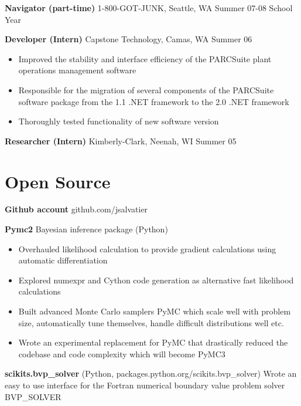 \documentclass[margin]{res}
\begin{document}
\begin{resume}
  {\bf Navigator (part-time)} 1-800-GOT-JUNK, Seattle, WA \hfill  Summer 07-08 School Year

  {\bf Developer (Intern)} Capstone Technology, Camas, WA \hfill  Summer 06
  \begin{itemize} \itemsep -2pt
    \item Improved the stability and interface efficiency of the PARCSuite plant operations management software 
    \item Responsible for the migration of several components of the PARCSuite software package from the 1.1 .NET framework to the 2.0 .NET framework 
    \item Thoroughly tested functionality of new software version 
   \end{itemize}

  {\bf Researcher (Intern)} Kimberly-Clark, Neenah, WI \hfill  Summer 05

\section{Open Source}
  {\bf Github account} github.com/jsalvatier 

  {\bf Pymc2} Bayesian inference package (Python) 
  \begin{itemize} \itemsep -2pt
    \item Overhauled likelihood calculation to provide gradient calculations using automatic differentiation
    \item Explored numexpr and Cython code generation as alternative fast likelihood calculations
    \item Built advanced Monte Carlo samplers PyMC which scale well with problem size, automatically tune themselves, handle difficult distributions well etc.
    \item Wrote an experimental replacement for PyMC that drastically reduced the codebase and code complexity which will become PyMC3
   \end{itemize}

  {\bf scikits.bvp\_solver} (Python, packages.python.org/scikits.bvp\_solver) 
    Wrote an easy to use interface for the Fortran numerical boundary value problem solver BVP\_SOLVER 
  

\end{resume} 
\end{document}

